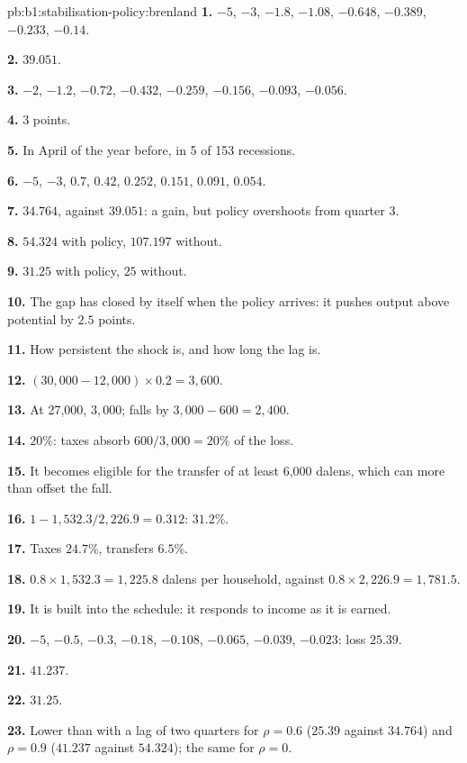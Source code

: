 \begin{solution}{pb:b1:stabilisation-policy:brenland}
\textbf{1.} $-5$, $-3$, $-1.8$, $-1.08$, $-0.648$, $-0.389$, $-0.233$, $-0.14$.

\textbf{2.} $39.051$.

\textbf{3.} $-2$, $-1.2$, $-0.72$, $-0.432$, $-0.259$, $-0.156$, $-0.093$, $-0.056$.

\textbf{4.} $3$ points.

\textbf{5.} In April of the year before, in 5 of 153 recessions.

\textbf{6.} $-5$, $-3$, $0.7$, $0.42$, $0.252$, $0.151$, $0.091$, $0.054$.

\textbf{7.} $34.764$, against $39.051$: a gain, but policy overshoots from quarter 3.

\textbf{8.} $54.324$ with policy, $107.197$ without.

\textbf{9.} $31.25$ with policy, $25$ without.

\textbf{10.} The gap has closed by itself when the policy arrives: it pushes
output above potential by $2.5$ points.

\textbf{11.} How persistent the shock is, and how long the lag is.

\textbf{12.} $(30{,}000 - 12{,}000) \times 0.2 = 3{,}600$.

\textbf{13.} At 27,000, $3{,}000$;  falls by $3{,}000 - 600 = 2{,}400$.

\textbf{14.} $20\%$: taxes absorb $600/3{,}000 = 20\%$ of the loss.

\textbf{15.} It becomes eligible for the transfer of at least 6,000 dalens,
which can more than offset the fall.

\textbf{16.} $1 - 1{,}532.3/2{,}226.9 = 0.312$: $31.2\%$.

\textbf{17.} Taxes $24.7\%$, transfers $6.5\%$.

\textbf{18.} $0.8 \times 1{,}532.3 = 1{,}225.8$ dalens per household, against $0.8 \times 2{,}226.9 = 1{,}781.5$.

\textbf{19.} It is built into the schedule: it responds to income as it is
earned.

\textbf{20.} $-5$, $-0.5$, $-0.3$, $-0.18$, $-0.108$, $-0.065$, $-0.039$, $-0.023$: loss $25.39$.

\textbf{21.} $41.237$.

\textbf{22.} $31.25$.

\textbf{23.} Lower than with a lag of two quarters for $\rho = 0.6$ ($25.39$ against $34.764$) and $\rho = 0.9$
($41.237$ against $54.324$); the same for $\rho = 0$.


\end{solution}
